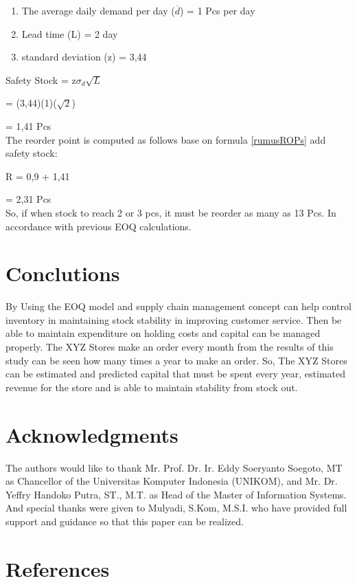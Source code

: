 \documentclass[12pt,a4paper,final]{iopart}
\begin{document}
\begin{enumerate}[label=(\alph*)]
	\item The average daily demand per day ($\overline{d}$) = 1 Pcs per day
	\item Lead time (L) = 2 day
	\item standard deviation (z) = 3,44
\end{enumerate}

Safety Stock = z$\sigma_d\sqrt{L}$

= (3,44)(1)($\sqrt{2}$)

= 1,41 Pcs\\
The reorder point is computed as follows base on formula \ref{rumusROPs} add safety stock:

R = 0,9 + 1,41

= 2,31 Pcs\\
So, if when stock to reach 2 or 3 pcs, it must be reorder as many as 13 Pcs. In accordance with previous EOQ calculations.


\section{Conclutions}
By Using the EOQ model and supply chain management concept can help control inventory in maintaining stock stability in improving customer service. Then be able to maintain expenditure on holding costs and capital can be managed properly. The XYZ Stores make an order every month from the results of this study can be seen how many times a year to make an order. So, The XYZ Stores can be estimated and predicted capital that must be spent every year, estimated revenue for the store and is able to maintain stability from stock out.

\section*{Acknowledgments}
The authors would like to thank Mr. Prof. Dr. Ir. Eddy Soeryanto Soegoto, MT as Chancellor of the Universitas Komputer Indonesia (UNIKOM), and Mr. Dr. Yeffry Handoko Putra, ST., M.T. as Head of the Master of Information Systems. And special thanks were given to Mulyadi, S.Kom, M.S.I. who have provided full support and guidance so that this paper can be realized. 


\section*{References}




\end{document}
